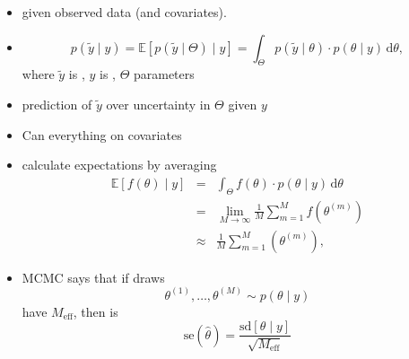 \documentclass[10pt]{report}
\newcommand{\draw}[2]{#1^{(#2)}}
\newcommand{\displayfrac}[2]{{\displaystyle \frac{\displaystyle #1}{\displaystyle #2}}}
\begin{document}
\begin{itemize}
\item {} given observed data (and covariates).
\item {}
$$p(\tilde{y} \mid y) =
\mathbb{E}[p(\widetilde{y} \mid \Theta) \mid y]
= \int_\Theta p(\widetilde{y} \mid \theta) \cdot p(\theta \mid y) \, \textrm{d}\theta,
$$
where $\widetilde{y}$ is , $y$ is , $\Theta$ parameters
\item {} prediction of $\tilde{y}$ over uncertainty in
  $\Theta$
  given $y$
\item Can  everything on covariates
\end{itemize}

\begin{itemize}
  \item calculate  expectations by averaging
\begin{eqnarray*}
  \mathbb{E}[f(\theta) \mid y]
  & = & \textstyle \int_{\Theta} f(\theta) \cdot p(\theta \mid y) \,
        \textrm{d}\theta
        \\[4pt]
  & = & \textstyle \lim_{M \rightarrow \infty} \frac{1}{M} \sum_{m = 1}^M
        f(\draw{\theta}{m})
        \\[4pt]
  & \approx & \textstyle \frac{1}{M} \sum_{m = 1}^M (\draw{\theta}{m}),
\end{eqnarray*}
\item MCMC  says that if draws
\[
  \draw{\theta}{1}, \ldots, \draw{\theta}{M} \sim p(\theta \mid y)
\]
have  $M_{\textrm{eff}}$, then
 is
\[
\textrm{se}(\hat{\theta})
  = \displayfrac{\textrm{sd}[\theta \mid y]}
                {\sqrt{M_{\textrm{eff}}}} 
\]
\end{itemize}
\end{document}
